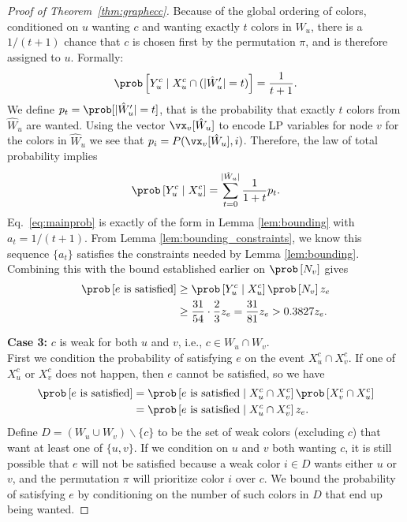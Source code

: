 \begin{proof}[Proof of Theorem~\ref{thm:graphecc}]
	Because of the global ordering of colors, conditioned on $u$ wanting $c$ and wanting exactly $t$ colors in $\hat{W}_u$, there is a $1/(t+1)$ chance that $c$ is chosen first by the permutation $\pi$, and is therefore assigned to $u$. Formally:
	\begin{equation*}
		\prob\left[ Y_u^c \mid X_u^c  \cap (|\hat{W}'_u| = t)\right] = \frac{1}{t+1}.
	\end{equation*}
	We define $p_t = \prob[ |\hat{W}'_u| = t]$, that is the probability that exactly $t$ colors from $\hat{W}_u$ are wanted. Using the vector $\vx_v[\hat{W}_u]$ to encode LP variables for node $v$ for the colors in $\hat{W}_u$ we see that $p_i = P(\vx_v[\hat{W}_u], i)$. Therefore, the law of total probability implies
	\begin{equation}
		\label{eq:mainprob}
		\prob\left[ Y_u^c \mid X_u^c \right] 
		= \sum_{t = 0}^{|\hat{W}_u|} \frac{1}{1+t} p_t.
	\end{equation}
	Eq.~\eqref{eq:mainprob} is exactly of the form in Lemma \ref{lem:bounding} with $a_t = 1/(t+1)$. From Lemma \ref{lem:bounding_constraints}, we know this sequence $\{a_t\}$ satisfies the constraints needed by Lemma \ref{lem:bounding}. Combining this with the bound established earlier on $\prob\left[ N_v \right]$ gives
	\begin{align*}
		\prob\left[e \text{ is satisfied}\right] & \geq \prob\left[ Y_u^c \mid X_u^c \right] \prob\left[ N_v \right] z_e \\
		& \geq \frac{31}{54} \cdot \frac{2}{3} z_e = \frac{31}{81}z_e > 0.3827 z_e.
	\end{align*}


	\textbf{Case 3:} $c$ is weak for both $u$ and $v$, i.e., $c \in W_u \cap W_v$.\\
	First we condition the probability of satisfying $e$ on the event $X_u^c \cap X_v^c$. If one of $X_u^c$ or $X_v^c$ does not happen, then $e$ cannot be satisfied, so we have
	\begin{align*}
		\prob\left[ \text{$e$ is satisfied} \right]&= \prob\left[ \text{$e$ is satisfied} \mid X_u^c \cap X_v^c \right] \prob\left[ X_v^c \cap X_u^c \right] \\
		&= \prob\left[ \text{$e$ is satisfied} \mid X_u^c \cap X_v^c \right] z_e.
	\end{align*}
	Define $D = (W_u \cup W_v) \backslash \{c\}$ to be the set of weak colors (excluding $c$) that want at least one of $\{u,v\}$. If we condition on $u$ and $v$ both wanting $c$, it is still possible that $e$ will not be satisfied because a weak color $i \in D$ wants either $u$ or $v$, and the permutation $\pi$ will prioritize color $i$ over $c$. We bound the probability of satisfying $e$ by conditioning on the number of such colors in $D$ that end up being wanted. 
	

\end{proof}
